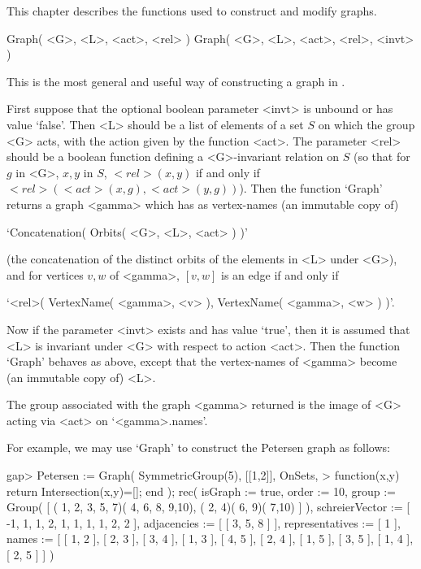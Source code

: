 %
%
%
%

This chapter describes the functions used to construct and modify graphs.


\>Graph( <G>, <L>, <act>, <rel> )
\>Graph( <G>, <L>, <act>, <rel>, <invt> )

This  is the most  general  and  useful  way  of constructing a graph
in {\GRAPE}.

First suppose that the optional boolean parameter <invt> is unbound or
has value `false'. Then <L> should be a list of elements of a set $S$ on
which the group <G> acts, with the action given by the function <act>. The
parameter <rel> should be a boolean function defining a <G>-invariant
relation on $S$ (so that for $g$ in <G>, $x,y$ in $S$, $<rel>(x,y)$
if and only if $<rel>(<act>(x,g),<act>(y,g))$). Then the function `Graph'
returns a graph <gamma> which has as vertex-names (an immutable copy of)

\centerline{`Concatenation( Orbits( <G>, <L>, <act> ) )'} 

(the concatenation of the distinct orbits of the elements in <L> under
<G>), and for vertices $v,w$ of <gamma>, $[v,w]$ is an edge if and only if

\centerline{`<rel>( VertexName( <gamma>, <v> ), VertexName( <gamma>, <w> ) )'.}

Now if the  parameter <invt> exists  and  has value `true',  then  it  is
assumed  that <L> is invariant  under <G> with respect  to  action <act>.
Then the function `Graph' behaves as above,  except that the vertex-names
of <gamma> become (an immutable copy of) <L>.

The group associated with the graph <gamma> returned is  the image of <G>
acting via <act> on `<gamma>.names'.

For example, we may use `Graph' to construct the Petersen graph as follows:

\beginexample
gap> Petersen := Graph( SymmetricGroup(5), [[1,2]], OnSets,
>                    function(x,y) return Intersection(x,y)=[]; end );
rec(
  isGraph := true,
  order := 10,
  group := Group( [ ( 1, 2, 3, 5, 7)( 4, 6, 8, 9,10), ( 2, 4)( 6, 9)( 7,10)
     ] ),
  schreierVector := [ -1, 1, 1, 2, 1, 1, 1, 1, 2, 2 ],
  adjacencies := [ [ 3, 5, 8 ] ],
  representatives := [ 1 ],
  names := [ [ 1, 2 ], [ 2, 3 ], [ 3, 4 ], [ 1, 3 ], [ 4, 5 ], [ 2, 4 ],
      [ 1, 5 ], [ 3, 5 ], [ 1, 4 ], [ 2, 5 ] ] )
\endexample


